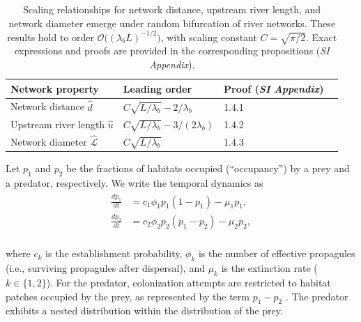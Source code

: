 \documentclass[9pt,twocolumn,twoside]{pnas-new}
\begin{document}
\begin{table}
    \caption{Scaling relationships for network distance, upstream river length, and network diameter emerge under random bifurcation of river networks. These results hold to order $\mathcal{O}\bigl((\lambda_b L)^{-1/2}\bigr)$, with scaling constant $C = \sqrt{\pi/2}$. Exact expressions and proofs are provided in the corresponding propositions (\textit{SI Appendix}).}
    \centering
    \begin{tabular}{llll}
        \hline
        Network property & Leading order & Proof (\textit{SI Appendix})\\
        \hline
         Network distance $\hat{d}$ & $C\sqrt{L/\lambda_b} - 2/ \lambda_b$ & 1.4.1 \\
         Upstream river length $\hat{u}$ & $C\sqrt{L/\lambda_b} - 3/(2 \lambda_b)$ & 1.4.2 \\
         Network diameter $\hat{\mathcal{L}}$ & $C\sqrt{L/\lambda_b}$ & 1.4.3 \\
         \hline
    \end{tabular}
    \label{tab:scaling}
\end{table}

Let $p_{1}$ and $p_{2}$ be the fractions of habitats occupied (``occupancy'') by a prey and a predator, respectively.
We write the temporal dynamics as
\\
\begin{align}
\begin{split}
    \frac{dp_{1}}{dt} &= c_1 \phi_1 p_1(1 - p_{1}) - \mu_{1} p_{1},\\
    \frac{dp_{2}}{dt} &= c_2 \phi_2 p_2 (p_{1} - p_{2}) - \mu_{2} p_{2},   
\end{split}
\label{eq:model-pp}
\end{align}
\\
where $c_k$ is the establishment probability, $\phi_{k}$ is the number of effective propagules (i.e., surviving propagules after dispersal), and $\mu_{k}$ is the extinction rate ($k \in \{1,2\}$).
For the predator, colonization attempts are restricted to habitat patches occupied by the prey, as represented by the term $p_{1} - p_{2}$ \citep{holt_food_2002, takimoto_effects_2012, calcagno_constraints_2011}.
The predator exhibits a nested distribution within the distribution of the prey.
\end{document}

